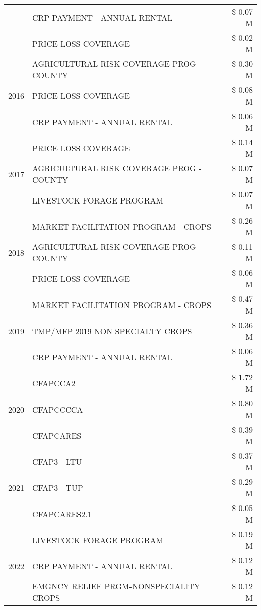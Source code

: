 \begin{tabular}{llr}
 & CRP PAYMENT - ANNUAL RENTAL & \$ 0.07 M \\
 & PRICE LOSS COVERAGE & \$ 0.02 M \\
\cline{1-3}
\multirow[t]{3}{*}{2016} & AGRICULTURAL RISK COVERAGE PROG - COUNTY & \$ 0.30 M \\
 & PRICE LOSS COVERAGE & \$ 0.08 M \\
 & CRP PAYMENT - ANNUAL RENTAL & \$ 0.06 M \\
\cline{1-3}
\multirow[t]{3}{*}{2017} & PRICE LOSS COVERAGE & \$ 0.14 M \\
 & AGRICULTURAL RISK COVERAGE PROG - COUNTY & \$ 0.07 M \\
 & LIVESTOCK FORAGE PROGRAM & \$ 0.07 M \\
\cline{1-3}
\multirow[t]{3}{*}{2018} & MARKET FACILITATION PROGRAM - CROPS & \$ 0.26 M \\
 & AGRICULTURAL RISK COVERAGE PROG - COUNTY & \$ 0.11 M \\
 & PRICE LOSS COVERAGE & \$ 0.06 M \\
\cline{1-3}
\multirow[t]{3}{*}{2019} & MARKET FACILITATION PROGRAM - CROPS & \$ 0.47 M \\
 & TMP/MFP 2019 NON SPECIALTY CROPS & \$ 0.36 M \\
 & CRP PAYMENT - ANNUAL RENTAL & \$ 0.06 M \\
\cline{1-3}
\multirow[t]{3}{*}{2020} & CFAPCCA2 & \$ 1.72 M \\
 & CFAPCCCCA & \$ 0.80 M \\
 & CFAPCARES & \$ 0.39 M \\
\cline{1-3}
\multirow[t]{3}{*}{2021} & CFAP3 - LTU & \$ 0.37 M \\
 & CFAP3 - TUP & \$ 0.29 M \\
 & CFAPCARES2.1 & \$ 0.05 M \\
\cline{1-3}
\multirow[t]{3}{*}{2022} & LIVESTOCK FORAGE PROGRAM & \$ 0.19 M \\
 & CRP PAYMENT - ANNUAL RENTAL & \$ 0.12 M \\
 & EMGNCY RELIEF PRGM-NONSPECIALITY CROPS & \$ 0.12 M \\
\cline{1-3}
\bottomrule
\end{tabular}
